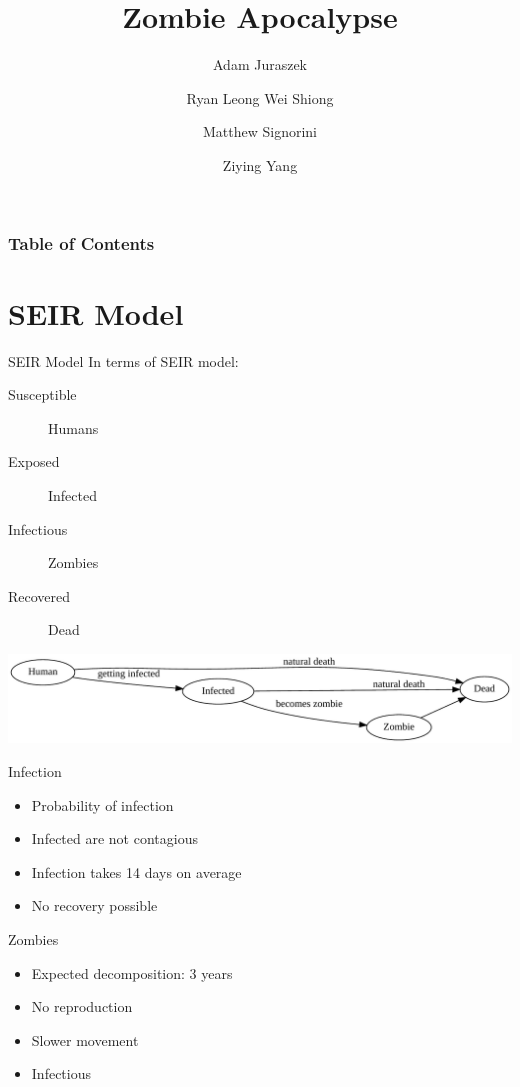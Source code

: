 \documentclass{beamer}
\title{Zombie Apocalypse}
\author{Adam Juraszek \and Ryan Leong Wei Shiong \and Matthew Signorini \and Ziying Yang}
\institute{The University of Melbourne}
\begin{document}
\begin{frame}
    \titlepage
\end{frame}

\begin{frame}
    \frametitle{Table of Contents}
    \tableofcontents
\end{frame}

\section{SEIR Model}

\begin{frame}{SEIR Model}
    In terms of SEIR model:
    \begin{description}
        \item[Susceptible] Humans
        \item[Exposed] Infected
        \item[Infectious] Zombies
        \item[Recovered] Dead
    \end{description}

    \begin{center}
        \includegraphics[width=\textwidth]{model}
    \end{center}
\end{frame}

\begin{frame}{Infection}
    \begin{itemize}
        \item Probability of infection
        \item Infected are not contagious
        \item Infection takes 14 days on average
        \item No recovery possible
    \end{itemize}
\end{frame} 

\begin{frame}{Zombies}
    \begin{itemize}
        \item Expected decomposition: 3 years
        \item No reproduction
        \item Slower movement
        \item Infectious
    \end{itemize}
\end{frame}
\end{document}
